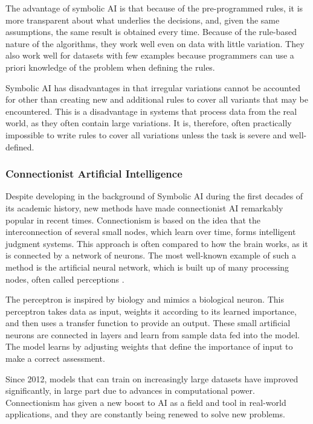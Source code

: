 The advantage of symbolic AI is that because of the pre-programmed rules, it is more transparent about what underlies the decisions, and, given the same assumptions, the same result is obtained every time. Because of the rule-based nature of the algorithms, they work well even on data with little variation. They also work well for datasets with few examples because programmers can use a priori knowledge of the problem when defining the rules.

Symbolic AI has disadvantages in that irregular variations cannot be accounted for other than creating new and additional rules to cover all variants that may be encountered. This is a disadvantage in systems that process data from the real world, as they often contain large variations. It is, therefore, often practically impossible to write rules to cover all variations unless the task is severe and well-defined.


\subsubsection{Connectionist Artificial Intelligence}
Despite developing in the background of Symbolic AI during the first decades of its academic history, new methods have made connectionist AI remarkably popular in recent times. Connectionism is based on the idea that the interconnection of several small nodes, which learn over time, forms intelligent judgment systems. This approach is often compared to how the brain works, as it is connected by a network of neurons. The most well-known example of such a method is the artificial neural network, which is built up of many processing nodes, often called perceptions \cite{mccullochLogicalCalculusIdeas1943}.

The perceptron is inspired by biology and mimics a biological neuron. This perceptron takes data as input, weights it according to its learned importance, and then uses a transfer function to provide an output. These small artificial neurons are connected in layers and learn from sample data fed into the model. The model learns by adjusting weights that define the importance of input to make a correct assessment.

Since 2012, models that can train on increasingly large datasets have improved significantly, in large part due to advances in computational power. Connectionism has given a new boost to AI as a field and tool in real-world applications, and they are constantly being renewed to solve new problems.

